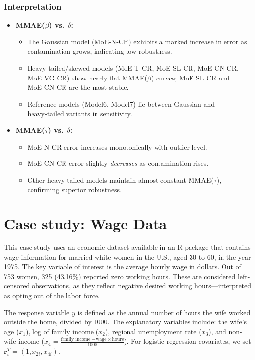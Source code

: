 \documentclass[10.5pt]{article} %
\begin{document}
\subsubsection{Interpretation}
\begin{itemize}
  \item \textbf{MMAE($\beta$) vs.\ $\delta$:}
    \begin{itemize}
      \item The Gaussian model (MoE‑N‑CR) exhibits a marked increase in error as contamination grows, indicating low robustness.
      \item Heavy‑tailed/skewed models (MoE‑T‑CR, MoE‑SL‑CR, MoE‑CN‑CR, MoE‑VG‑CR) show nearly flat MMAE($\beta$) curves; MoE‑SL‑CR and MoE‑CN‑CR are the most stable.
      \item Reference models (Model6, Model7) lie between Gaussian and heavy‑tailed variants in sensitivity.
    \end{itemize}

  \item \textbf{MMAE($\tau$) vs.\ $\delta$:}
    \begin{itemize}
      \item MoE‑N‑CR error increases monotonically with outlier level.
      \item MoE‑CN‑CR error slightly \emph{decreases} as contamination rises.
      \item Other heavy‑tailed models maintain almost constant MMAE($\tau$), confirming superior robustness.
    \end{itemize}
\end{itemize}

\section{Case study: Wage Data}

This case study uses an economic dataset available in an R package that contains wage information for married white women in the U.S., aged 30 to 60, in the year 1975. The key variable of interest is the average hourly wage in dollars. Out of 753 women, 325 (43.16\%) reported zero working hours. These are considered left-censored observations, as they reflect negative desired working hours—interpreted as opting out of the labor force.

\vspace{1em}

\noindent
The response variable \( y \) is defined as the annual number of hours the wife worked outside the home, divided by 1000. The explanatory variables include: the wife’s age (\(x_1\)), log of family income (\(x_2\)), regional unemployment rate (\(x_3\)), and non-wife income (\(x_4 = \frac{\text{family income} - \text{wage} \times \text{hours}}{1000}\)). For logistic regression covariates, we set\\ \( \mathbf{r}_i^T = (1, x_{2i}, x_{4i}) \).
\end{document}
